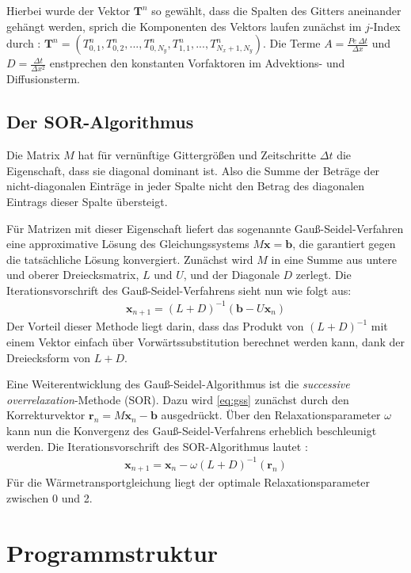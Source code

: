 Hierbei wurde der Vektor $\boldsymbol T^n$ so gewählt, dass die Spalten des Gitters aneinander gehängt werden, sprich die Komponenten des Vektors laufen zunächst im $j$-Index durch : $\boldsymbol T^n = \left( T^n_{0,1}, T^n_{0,2}, ..., T^n_{0,N_y}, T^n_{1,1},...,T^n_{N_x+1,N_y} \right)$.
Die Terme $A=\frac{Pe~\Delta t}{\Delta x}$ und $D=\frac{\Delta t}{\Delta x^2}$ enstprechen den konstanten Vorfaktoren im Advektions- und Diffusionsterm.

\newpage
\subsection{Der SOR-Algorithmus}
Die Matrix $M$ hat für vernünftige Gittergrößen und Zeitschritte $\Delta t$ die Eigenschaft, dass sie diagonal dominant ist. Also die Summe der Beträge der nicht-diagonalen Einträge in jeder Spalte nicht den Betrag des diagonalen Eintrags dieser Spalte übersteigt.

Für Matrizen mit dieser Eigenschaft liefert das sogenannte Gauß-Seidel-Verfahren eine approximative Lösung des Gleichungssystems $ M\boldsymbol x = \boldsymbol b$, die garantiert gegen die tatsächliche Lösung konvergiert.
Zunächst wird $M$ in eine Summe aus untere und oberer Dreiecksmatrix, $L$ und $U$, und der Diagonale $D$ zerlegt. Die Iterationsvorschrift des Gauß-Seidel-Verfahrens sieht nun wie folgt aus\cite{numstr}:
\begin{align}
  \boldsymbol x_{n+1} = (L+D)^{-1}(\boldsymbol b - U\boldsymbol x_{n}) \label{eq:gss}
\end{align}
Der Vorteil dieser Methode liegt darin, dass das Produkt von $(L+D)^{-1}$ mit einem Vektor einfach über Vorwärtssubstitution berechnet werden kann, dank der Dreiecksform von $L+D$.

Eine Weiterentwicklung des Gauß-Seidel-Algorithmus ist die \emph{successive overrelaxation}-Methode (SOR). Dazu wird \cref{eq:gss} zunächst durch den Korrekturvektor $\boldsymbol r_n = M\boldsymbol x_n -\boldsymbol b$ ausgedrückt.
Über den Relaxationsparameter $\omega$ kann nun die Konvergenz des Gauß-Seidel-Verfahrens erheblich beschleunigt werden.
Die Iterationsvorschrift des SOR-Algorithmus lautet \cite{sor}:
\begin{align}
  \boldsymbol x_{n+1} = \boldsymbol x_n - \omega (L+D)^{-1}(\boldsymbol r_n) \label{eq:sor}
\end{align}
Für die Wärmetransportgleichung liegt der optimale Relaxationsparameter zwischen 0 und 2.

\newpage
\section{Programmstruktur}

